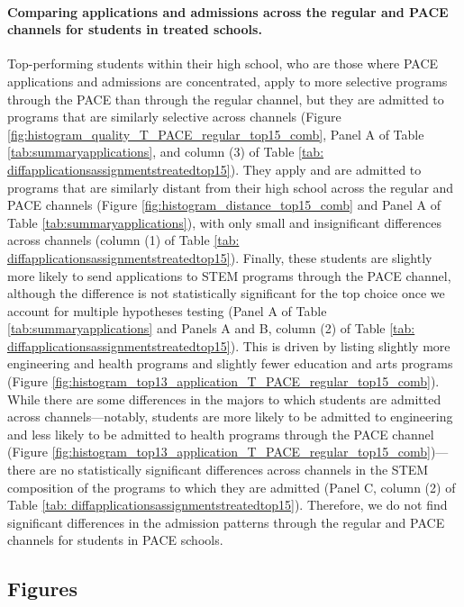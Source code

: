             


      
      \paragraph{Comparing applications and admissions across the regular and PACE channels for students in treated schools.} Top-performing students within their high school, who are those where PACE applications and admissions are concentrated, apply to more selective programs through the PACE than through the regular channel, but they are admitted to programs that are similarly selective across channels (Figure \ref{fig:histogram_quality_T_PACE_regular_top15_comb}, Panel A of Table \ref{tab:summaryapplications}, and column (3) of Table \ref{tab: diffapplicationsassignmentstreatedtop15}). They apply and are admitted to programs that are similarly distant from their high school across the regular and PACE channels (Figure \ref{fig:histogram_distance_top15_comb} and Panel A of Table \ref{tab:summaryapplications}), with only small and insignificant differences across channels (column (1) of Table \ref{tab: diffapplicationsassignmentstreatedtop15}). Finally, these students are slightly more likely to send applications to STEM programs through the PACE channel, although the difference is not statistically significant for the top choice once we account for multiple hypotheses testing (Panel A of Table \ref{tab:summaryapplications} and Panels A and B, column (2) of Table \ref{tab: diffapplicationsassignmentstreatedtop15}). This is driven by listing slightly more engineering and health programs and slightly fewer education and arts programs (Figure \ref{fig:histogram_top13_application_T_PACE_regular_top15_comb}). While there are some differences in the majors to which students are admitted across channels---notably, students are more likely to be admitted to engineering and less likely to be admitted to health programs through the PACE channel (Figure \ref{fig:histogram_top13_application_T_PACE_regular_top15_comb})---there are no statistically significant differences across channels in the STEM composition of the programs to which they are admitted (Panel C, column (2) of Table \ref{tab: diffapplicationsassignmentstreatedtop15}). Therefore, we do not find significant differences in the admission patterns through the regular and PACE channels for students in PACE schools.\par 


\subsection{Figures}

